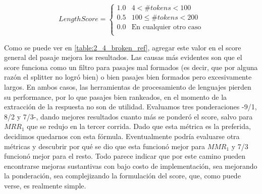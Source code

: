 \begin{equation*}
    LengthScore = \begin{cases}
               1.0     & 4 <   \#tokens < 100\\
               0.5     & 100 \leq \#tokens < 200 \\
               0.0     & \text{En cualquier otro caso}\\
           \end{cases}
\end{equation*}


Como se puede ver en \ref{table:2_4_broken_ref}, agregar este valor en el score general del pasaje mejora los resultados. Las causas más evidentes son que el score funciona como un filtro para pasajes mal formados (es decir, que por alguna razón el splitter no logró  bien) o bien pasajes bien formados pero excesivamente largos. En ambos casos, las herramientas de procesamiento de lenguajes pierden su performance, por lo que pasajes bien rankeados, en el momento de la extracción de la respuesta no son de utilidad. Evaluamos tres ponderaciones -9/1, 8/2 y 7/3-, dando mejores resultados cuanto más se ponderó el score, salvo para $MRR_1$ que se redujo en la tercer corrida. Dado que esta métrica es la preferida, decidimos quedarnos con esta fórmula. Eventualmente podría evaluarse otra métricas y descubrir por qué se dio que esta funcionó mejor para $MMR_1$ y 7/3 funcionó mejor para el resto. Todo parece indicar que por este camino pueden encontrarse mejoras sustantivas con bajo costo de implementación, sea mejorando la ponderación, sea complejizando la formulación del score, que, como puede verse, es realmente simple.





